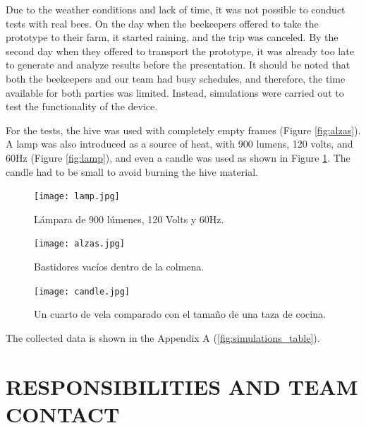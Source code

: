 \documentclass[12pt]{report}
\begin{document}
	\par Due to the weather conditions and lack of time, it was not possible to conduct tests with real bees. On the day when the beekeepers offered to take the prototype to their farm, it started raining, and the trip was canceled. By the second day when they offered to transport the prototype, it was already too late to generate and analyze results before the presentation. It should be noted that both the beekeepers and our team had busy schedules, and therefore, the time available for both parties was limited. Instead, simulations were carried out to test the functionality of the device.
	
	\par For the tests, the hive was used with completely empty frames (Figure \ref{fig:alzas}). A lamp was also introduced as a source of heat, with 900 lumens, 120 volts, and 60Hz (Figure \ref{fig:lamp}), and even a candle was used as shown in Figure \ref{fig:candle}. The candle had to be small to avoid burning the hive material.
	
	\begin{figure}[htbp]
		\begin{minipage}{0.4\textwidth}
			\centering
			\texttt{[image: lamp.jpg]}
			\caption{Lámpara de 900 lúmenes, 120 Volts y 60Hz.}
			\label{fig:lamp}
		\end{minipage}\hfill
		\begin{minipage}{0.4\textwidth}
			\centering
			\texttt{[image: alzas.jpg]}
			\caption{Bastidores vacíos dentro de la colmena.}
			\label{fig:alzas}
		\end{minipage}\hfill
		\begin{minipage}{0.4\textwidth}
			\centering
			\texttt{[image: candle.jpg]}
			\caption{Un cuarto de vela comparado con el tamaño de una taza de cocina.}
			\label{fig:candle}
		\end{minipage}
	\end{figure}
	
	The collected data is shown in the Appendix A (\ref{fig:simulations_table}).
	
	\pagebreak
	\chapter{RESPONSIBILITIES AND TEAM CONTACT}
	
\end{document}
